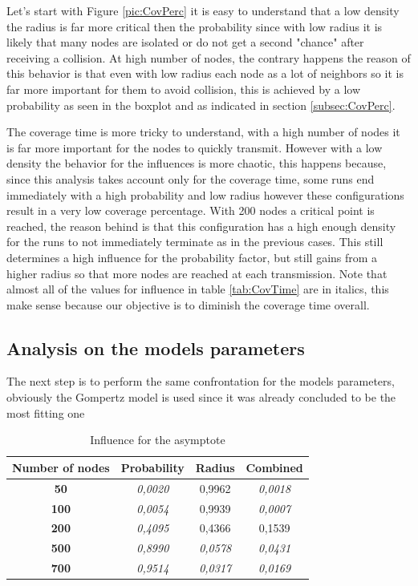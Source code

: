 Let's start with Figure \ref{pic:CovPerc} it is easy to understand that a low density the radius is far more critical then the probability since with low radius it is likely that many nodes are isolated or do not get a second "chance" after receiving a collision. At high number of nodes, the contrary happens the reason of this behavior is that even with low radius each node as a lot of neighbors so it is far more important for them to avoid collision, this is achieved by a low probability as seen in the boxplot and as indicated in section \ref{subsec:CovPerc}.

The coverage time is more tricky to understand, with a high number of nodes it is far more important for the nodes to quickly transmit. However with a low density the behavior for the influences is more chaotic, this happens because, since this analysis takes account only for the coverage time, some runs end immediately with a high probability and low radius however these configurations result in a very low coverage percentage. With 200 nodes a critical point is reached, the reason behind is that this configuration has a high enough density for the runs to not immediately terminate as in the previous cases. This still determines a high influence for the probability factor, but still gains from a higher radius so that more nodes are reached at each transmission. Note that almost all of the values for influence in table \ref{tab:CovTime} are in italics, this make sense because our objective is to diminish the coverage time overall.

\iffalse
\subsection{Analysis on the models parameters}
The next step is to perform the same confrontation for the models parameters, obviously the Gompertz model is used since it was already concluded to be the most fitting one

\begin{table}[H]
\centering
\begin{tabular}{|c|c|c|c|}
\hline
\textbf{Number of   nodes} & \textbf{Probability} & \textbf{Radius} & \textbf{Combined} \\ \hline
\textbf{50} & \textit{0,0020} & 0,9962 & \textit{0,0018} \\ \hline
\textbf{100} & \textit{0,0054} & 0,9939 & \textit{0,0007} \\ \hline
\textbf{200} & \textit{0,4095} & 0,4366 & 0,1539 \\ \hline
\textbf{500} & \textit{0,8990} & \textit{0,0578} & \textit{0,0431} \\ \hline
\textbf{700} & \textit{0,9514} & \textit{0,0317} & \textit{0,0169} \\ \hline
\end{tabular}
\caption{Influence for the asymptote}
\end{table}

